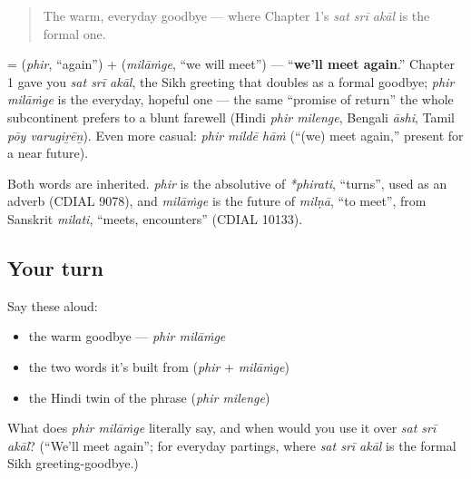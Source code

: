 \label{lesson:PA-C04-phir-milaange}



\begin{quote}
The warm, everyday goodbye — where Chapter 1's \emph{sat srī akāl} is the formal one.
\end{quote}

\begin{cousinweb}
\textbf{ } = \textbf{} (\emph{phir}, \textquotedblleft{}again\textquotedblright{}) + \textbf{} (\emph{milāṁge}, \textquotedblleft{}we will meet\textquotedblright{}) — \textquotedblleft{}\textbf{we'll meet again}.\textquotedblright{} Chapter 1 gave you \emph{sat srī akāl}, the Sikh greeting that doubles as a formal goodbye; \emph{phir milāṁge} is the everyday, hopeful one — the same \textquotedblleft{}promise of return\textquotedblright{} the whole subcontinent prefers to a blunt farewell (Hindi \emph{phir milenge}, Bengali \emph{āshi}, Tamil \emph{pōy varugiṟēṉ}). Even more casual: \emph{phir mildē hāṁ} (\textquotedblleft{}(we) meet again,\textquotedblright{} present for a near future).

Both words are inherited. \emph{phir} is the absolutive of \emph{*phirati}, \textquotedblleft{}turns\textquotedblright{}, used as an adverb (CDIAL 9078), and \emph{milāṁge} is the future of \emph{milṇā}, \textquotedblleft{}to meet\textquotedblright{}, from Sanskrit \emph{milati}, \textquotedblleft{}meets, encounters\textquotedblright{} (CDIAL 10133).
\end{cousinweb}

\subsection*{Your turn}
Say these aloud:

\begin{itemize}
\raggedright
  \item the warm goodbye — \emph{phir milāṁge}
  \item the two words it's built from (\emph{phir} + \emph{milāṁge})
  \item the Hindi twin of the phrase (\emph{phir milenge})
\end{itemize}

\begin{tcolorbox}[breakable,colback=teal!4,colframe=teal!35!black,title={Before you move on}]
What does \emph{phir milāṁge} literally say, and when would you use it over \emph{sat srī akāl}? (\textquotedblleft{}We'll meet again\textquotedblright{}; for everyday partings, where \emph{sat srī akāl} is the formal Sikh greeting-goodbye.)
\end{tcolorbox}
